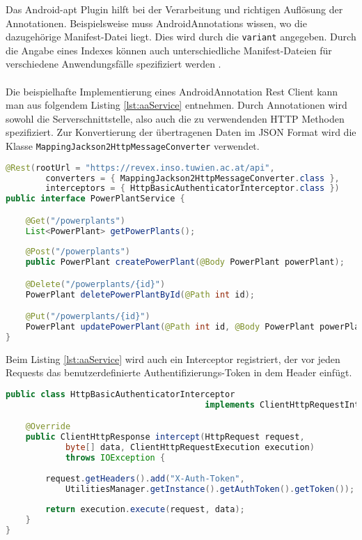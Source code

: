 Das Android-apt Plugin hilft bei der Verarbeitung und richtigen Auflösung der Annotationen. Beispielsweise muss AndroidAnnotations wissen, wo die dazugehörige Manifest-Datei liegt. Dies wird durch die  \texttt{variant} angegeben. Durch die Angabe eines Indexes können auch unterschiedliche Manifest-Dateien für verschiedene Anwendungsfälle spezifiziert werden \cite{android:apt}.
\\\\
Die beispielhafte Implementierung eines AndroidAnnotation Rest Client kann man aus folgendem Listing \ref{lst:aaService} entnehmen. Durch Annotationen wird sowohl die Serverschnittstelle, also auch die zu verwendenden HTTP Methoden spezifiziert. Zur Konvertierung der übertragenen Daten im JSON Format wird die Klasse \texttt{MappingJackson2HttpMessageConverter} verwendet.

\begin{lstlisting}[language=java, caption={Auszug aus dem PowerPlantService Interface},label={lst:aaService}, escapechar=|, frame=single]
@Rest(rootUrl = "https://revex.inso.tuwien.ac.at/api",
		converters = { MappingJackson2HttpMessageConverter.class },
		interceptors = { HttpBasicAuthenticatorInterceptor.class })
public interface PowerPlantService {

	@Get("/powerplants")
	List<PowerPlant> getPowerPlants();
	
	@Post("/powerplants")
	public PowerPlant createPowerPlant(@Body PowerPlant powerPlant);

	@Delete("/powerplants/{id}")
	PowerPlant deletePowerPlantById(@Path int id);

	@Put("/powerplants/{id}")
	PowerPlant updatePowerPlant(@Path int id, @Body PowerPlant powerPlant);
}
\end{lstlisting}

Beim Listing \ref{lst:aaService} wird auch ein Interceptor registriert, der vor jeden Requests das benutzerdefinierte Authentifizierungs-Token in dem Header einfügt.

\begin{lstlisting}[language=java, caption={Interceptor für das setzen eines zusätzlichen HTTP Header Feldes},label={lst:aaService}, escapechar=|, frame=single]
public class HttpBasicAuthenticatorInterceptor  
										implements ClientHttpRequestInterceptor {

	@Override
	public ClientHttpResponse intercept(HttpRequest request, 
			byte[] data, ClientHttpRequestExecution execution) 
			throws IOException {
					
		request.getHeaders().add("X-Auth-Token", 
			UtilitiesManager.getInstance().getAuthToken().getToken());
			
		return execution.execute(request, data);
	}
}
\end{lstlisting}

